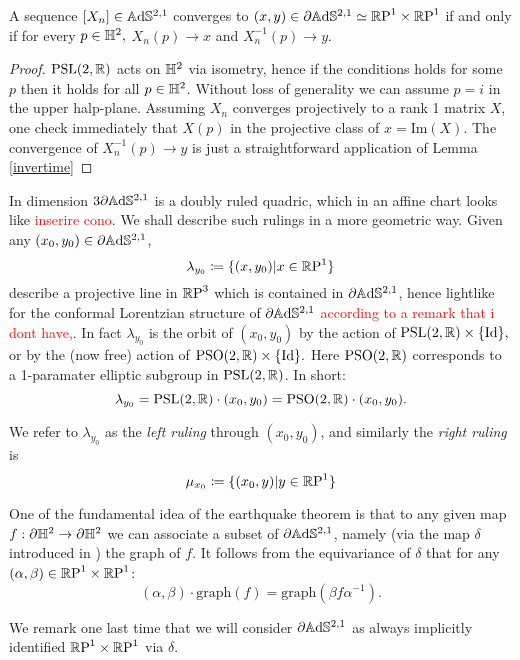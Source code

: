 \begin{lemma}\label{convergenza}
    A sequence $[X_n]\in\mathbb{A}\mathrm{d}\mathbb{S}^{2,1}$ converges to $(x,y)\in\partial\mathbb{A}\mathrm{d}\mathbb{S}^{2,1}\simeq\mathbb{R}\text{P}^1\times\mathbb{R}\text{P}^1$ if and only if for every $p\in\mathbb{H}^2,$ $X_n(p)\to x$ and $X_n^{-1}(p)\to y.$ 
\end{lemma}
\begin{proof}
    $\text{PSL}(2,\mathbb{R})$ acts on $\mathbb{H}^2$ via isometry, hence if the conditions holds for some $p$ then it holds for all $p\in\mathbb{H}^2$. Without loss of generality we can assume $p=i$ in the upper halp-plane. Assuming $X_n$ converges projectively to a rank 1 matrix $X$, one check immediately that $X(p)$ in the projective class of $x=\text{Im}(X).$ The convergence of $X_n^{-1}(p)\to y$ is just a straightforward application of Lemma \ref{invertime}
\end{proof}

In dimension $3 \partial\mathbb{A}\mathrm{d}\mathbb{S}^{2,1}$ is a doubly ruled quadric, which in an affine chart looks like \textcolor{red}{inserire cono}. We shall describe such rulings in a more geometric way. Given any $(x_0,y_0)\in\partial\mathbb{A}\mathrm{d}\mathbb{S}^{2,1}$, 
\[
    \lambda_{y_0}\coloneqq\{(x,y_0)|x\in\mathbb{R}\text{P}^1\}
\]  
describe a projective line in $\mathbb{R}\text{P}^3$ which is contained in $\partial\mathbb{A}\mathrm{d}\mathbb{S}^{2,1}$, hence lightlike for the conformal Lorentzian structure of $\partial\mathbb{A}\mathrm{d}\mathbb{S}^{2,1}$ \textcolor{red}{according to a remark that i dont have,}. In fact $\lambda_{y_0}$ is the orbit of $(x_0,y_0)$ by the action of $\text{PSL}(2,\mathbb{R})\times\{\text{Id}\},$ or by the (now free) action of $\text{PSO}(2,\mathbb{R})\times\{\text{Id}\}.$ Here $\text{PSO}(2,\mathbb{R})$ corresponds to a 1-paramater elliptic subgroup in $\text{PSL}(2,\mathbb{R})$. In short: 
\[
    \lambda_{y_0}=\text{PSL}(2,\mathbb{R})\cdot(x_0,y_0)=\text{PSO}(2,\mathbb{R})\cdot(x_0,y_0).
\]

We refer to $\lambda_{y_0}$ as the \textit{left ruling} through $(x_0,y_0)$, and similarly the \textit{right ruling} is 
\[
    \mu_{x_0}\coloneqq\{(x_0,y)|y\in\mathbb{R}\text{P}^1\}
\]

One of the fundamental idea of the earthquake theorem is that to any given map $f:\partial\mathbb{H}^2\to\partial \mathbb{H}^2$ we can associate a subset of $\partial\mathbb{A}\mathrm{d}\mathbb{S}^{2,1}$, namely (via the map $\delta$ introduced in ) the graph of $f$. It follows from the equivariance of $\delta$ that for any $(\alpha,\beta)\in\mathbb{R}\text{P}^1\times\mathbb{R}\text{P}^1$:
\begin{equation}
    (\alpha,\beta)\cdot\text{graph}(f)=\text{graph}(\beta f\alpha^{-1}).
\end{equation} 

We remark one last time that we will consider $\partial\mathbb{A}\mathrm{d}\mathbb{S}^{2,1}$ as always implicitly identified $\mathbb{R}\text{P}^1\times\mathbb{R}\text{P}^1$ via $\delta$.
